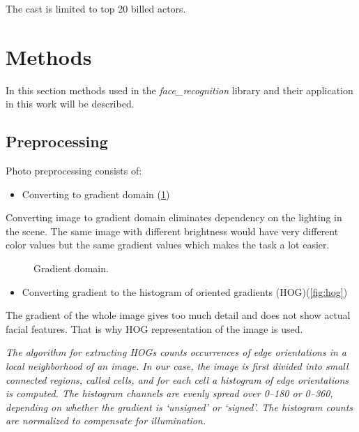 \documentclass[hidelinks, english]{mvi-report}
\newcommand{\subimage}[3][1]{
\subfigure{
\texttt{[image: \#2.\#3]}
}
}
\begin{document}
    The cast is limited to top 20 billed actors.


    \section{Methods}
    \vbox{
    In this section methods used in the \textit{face\_recognition} library and their application in this work will be described.
    }
    \subsection{Preprocessing}
    Photo preprocessing consists of:

    \begin{itemize}
        \item Converting to gradient domain (\cref{fig:gradient})
    \end{itemize}

    Converting image to gradient domain eliminates dependency on the lighting in the scene. The same image with different
    brightness would have very different color values but the same gradient values which makes the task a lot easier.

    \begin{figure}[H]
        \centering
        \subimage[0.17]{original}{jpg}
        \subimage[0.03]{arrow}{png}
        \subimage[0.17]{gradient}{jpg}
        \caption{Gradient domain.}
        \label{fig:gradient}
    \end{figure}

    \begin{itemize}
        \item Converting gradient to the histogram of oriented gradients (HOG)(\cref{fig:hog})
    \end{itemize}

    The gradient of the whole image gives too much detail and does not show actual facial features. That is why HOG
    representation of the image is used.

    \textit{The algorithm for extracting HOGs counts occurrences of edge orientations in a local neighborhood of an image.
    In our case, the image is first divided into small connected regions, called cells, and for each cell a histogram of
    edge orientations is computed. The histogram channels are evenly spread over 0–180 or 0–360, depending on whether
    the gradient is ‘unsigned’ or ‘signed’. The histogram counts are normalized to compensate for illumination.}\cite{hog}
\end{document}
